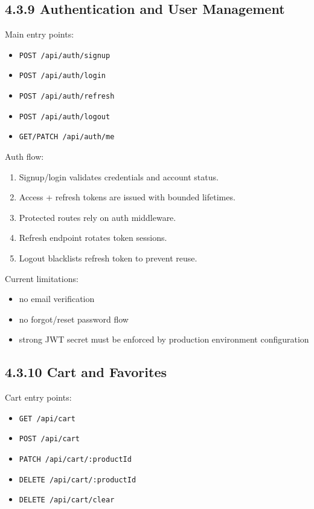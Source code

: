 \documentclass[12pt,a4paper]{report}
\begin{document}
\subsection{4.3.9 Authentication and User Management}
Main entry points:

\begin{itemize}
\item \texttt{POST /api/auth/signup}
\item \texttt{POST /api/auth/login}
\item \texttt{POST /api/auth/refresh}
\item \texttt{POST /api/auth/logout}
\item \texttt{GET/PATCH /api/auth/me}
\end{itemize}

Auth flow:

\begin{enumerate}
\item Signup/login validates credentials and account status.
\item Access + refresh tokens are issued with bounded lifetimes.
\item Protected routes rely on auth middleware.
\item Refresh endpoint rotates token sessions.
\item Logout blacklists refresh token to prevent reuse.
\end{enumerate}

Current limitations:

\begin{itemize}
\item no email verification
\item no forgot/reset password flow
\item strong JWT secret must be enforced by production environment configuration
\end{itemize}

\subsection{4.3.10 Cart and Favorites}
Cart entry points:

\begin{itemize}
\item \texttt{GET /api/cart}
\item \texttt{POST /api/cart}
\item \texttt{PATCH /api/cart/:productId}
\item \texttt{DELETE /api/cart/:productId}
\item \texttt{DELETE /api/cart/clear}
\end{itemize}
\end{document}
